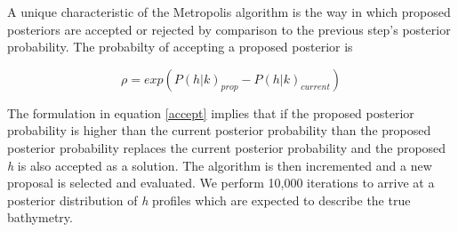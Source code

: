 A unique characteristic of the Metropolis algorithm is the way in which proposed posteriors are accepted or rejected by comparison to the previous step's posterior probability. The probabilty of accepting a proposed posterior is 

\begin{equation}\label{accept}
\rho = exp(P(h|%
k)_{prop} - P(h|%
k)_{current})
\end{equation}

The formulation in equation \ref{accept} implies that if the proposed posterior probability is higher than the current posterior probability than the proposed posterior probability replaces the current posterior probability and the proposed \textit{h} is also accepted as a solution. The algorithm is then incremented and a new proposal is selected and evaluated. We perform 10,000 iterations to arrive at a posterior distribution of \textit{h} profiles which are expected to describe the true bathymetry.















